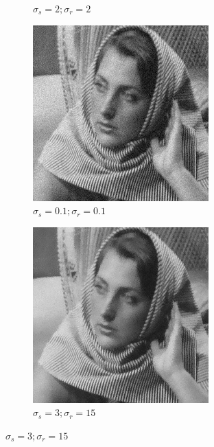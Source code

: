 \documentclass[12pt]{article}
\begin{document}
\begin{figure}[h]
\begin{subfigure}[b]{0.24\textwidth}
        \caption{$\sigma_s=2;\sigma_r=2$}
        \label{fig:subfig2}
    \end{subfigure}
    \begin{subfigure}[b]{0.24\textwidth}
        \centering
        \includegraphics[width=\textwidth]{../images/filtered_barbara_10_sigma_s_0.1_sigma_r_0.1.png}
        \caption{$\sigma_s=0.1;\sigma_r=0.1$}
        \label{fig:subfig3}
    \end{subfigure}
    \begin{subfigure}[b]{0.24\textwidth}
        \centering
        \includegraphics[width=\textwidth]{../images/filtered_barbara_10_sigma_s_3_sigma_r_15.png}
        \caption{$\sigma_s=3;\sigma_r=15$}
        \label{fig:subfig3}
    \end{subfigure}
    

\end{figure}
\end{document}
